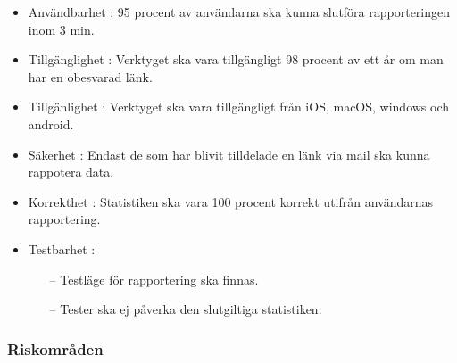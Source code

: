 \documentclass[12pt]{article}
\begin{document}
\begin{itemize}
    \item  Användbarhet : 95 procent av användarna ska kunna slutföra rapporteringen inom 3 min.
        \item Tillgänglighet : Verktyget ska vara tillgängligt 98 procent av ett år om man har en obesvarad länk.
        \item Tillgänlighet : Verktyget ska vara tillgängligt från iOS, macOS, windows och android. 
    \item Säkerhet : Endast de som har blivit tilldelade en länk via mail ska kunna rappotera data.
    \item Korrekthet : Statistiken ska vara 100 procent korrekt utifrån användarnas rapportering.
    \item Testbarhet :
    \begin{itemize}
        \item [--]Testläge för rapportering ska finnas.
        \item [--]Tester ska ej påverka den slutgiltiga statistiken. 
    \end{itemize}
\end{itemize}

\subsubsection{Riskområden}
\end{document}

